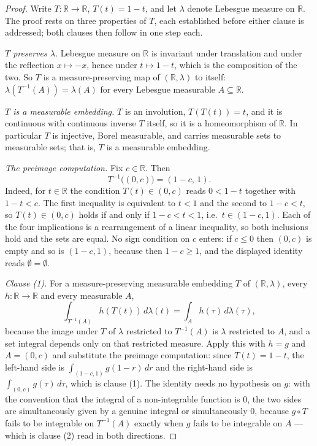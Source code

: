 \begin{proof}
Write $T : \mathbb{R} \to \mathbb{R}$, $T(t) = 1 - t$, and let $\lambda$ denote
Lebesgue measure on $\mathbb{R}$.  The proof rests on three properties of $T$,
each established before either clause is addressed; both clauses then follow in
one step each.

\emph{$T$ preserves $\lambda$.}  Lebesgue measure on $\mathbb{R}$ is invariant
under translation and under the reflection $x \mapsto -x$, hence under
$t \mapsto 1 - t$, which is the composition of the two.  So $T$ is a
measure-preserving map of $(\mathbb{R},\lambda)$ to itself:
$\lambda(T^{-1}(A)) = \lambda(A)$ for every Lebesgue measurable
$A \subseteq \mathbb{R}$.

\emph{$T$ is a measurable embedding.}  $T$ is an involution, $T(T(t)) = t$, and
it is continuous with continuous inverse $T$ itself, so it is a homeomorphism of
$\mathbb{R}$.  In particular $T$ is injective, Borel measurable, and carries
measurable sets to measurable sets; that is, $T$ is a measurable embedding.

\emph{The preimage computation.}  Fix $c \in \mathbb{R}$.  Then
\[
  T^{-1}\bigl((0,c)\bigr) = (1-c,\,1) .
\]
Indeed, for $t \in \mathbb{R}$ the condition $T(t) \in (0,c)$ reads $0 < 1 - t$
together with $1 - t < c$.  The first inequality is equivalent to $t < 1$ and
the second to $1 - c < t$, so $T(t) \in (0,c)$ holds if and only if
$1 - c < t < 1$, i.e.\ $t \in (1-c,1)$.  Each of the four implications is a
rearrangement of a linear inequality, so both inclusions hold and the sets are
equal.  No sign condition on $c$ enters: if $c \leq 0$ then $(0,c)$ is empty and
so is $(1-c,1)$, because then $1 - c \geq 1$, and the displayed identity reads
$\emptyset = \emptyset$.

\emph{Clause (1).}  For a measure-preserving measurable embedding $T$ of
$(\mathbb{R},\lambda)$, every $h : \mathbb{R} \to \mathbb{R}$ and every
measurable $A$,
\[
  \int_{T^{-1}(A)} h(T(t))\, d\lambda(t) = \int_{A} h(\tau)\, d\lambda(\tau) ,
\]
because the image under $T$ of $\lambda$ restricted to $T^{-1}(A)$ is $\lambda$
restricted to $A$, and a set integral depends only on that restricted measure.
Apply this with $h = g$ and $A = (0,c)$ and substitute the preimage
computation: since $T(t) = 1-t$, the left-hand side is
$\int_{(1-c,1)} g(1-r)\, dr$ and the right-hand side is
$\int_{(0,c)} g(\tau)\, d\tau$, which is clause (1).  The identity needs no
hypothesis on $g$: with the convention that the integral of a non-integrable
function is $0$, the two sides are simultaneously given by a genuine integral or
simultaneously $0$, because $g \circ T$ fails to be integrable on $T^{-1}(A)$
exactly when $g$ fails to be integrable on $A$ --- which is clause (2) read in
both directions.


\end{proof}
